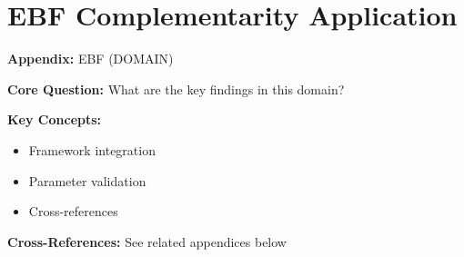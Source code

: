 %
%
%
%

\chapter{EBF Complementarity Application}
\label{app:domain-ebf}


\begin{tcolorbox}[colback=blue!5!white, colframe=blue!75!black,
    title=Quick Reference: Appendix EBF]

\textbf{Appendix:} EBF (DOMAIN)

\textbf{Core Question:} What are the key findings in this domain?

\textbf{Key Concepts:}
\begin{itemize}[nosep]
\item Framework integration
\item Parameter validation
\item Cross-references
\end{itemize}

\textbf{Cross-References:} See related appendices below
\end{tcolorbox}

\begin{abstract}
This appendix applies the mathematical theory of complementarity to the Evidence-Based
Framework (EBF) for behavioral change. We establish how complementarity operates across
the six FEPSDE utility dimensions, between intervention types, and across the Behavioral
Change Journey phases. The central insight is that behavioral interventions exhibit
strong complementarities: nudges work better with incentives, information is more
effective with defaults, and timing across BCJ phases creates multiplicative effects.
We provide specific $\gamma$ estimates for 15 intervention pairs and derive optimal
intervention portfolio strategies based on complementarity analysis.
\end{abstract}

